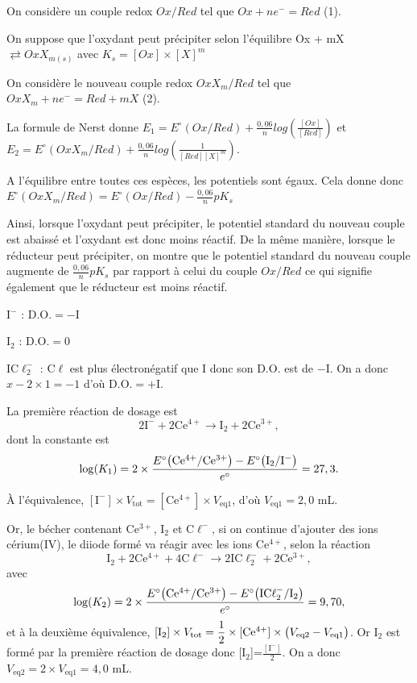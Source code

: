 \begin{solution}

\begin{questions}
\questioncours
 On considère un couple redox $Ox/Red$ tel que $Ox + ne^- = Red$ (1).
 
 On suppose que l'oxydant peut précipiter selon l'équilibre Ox + mX $\rightleftarrows OxX_{m(s)}$ avec $K_s=[Ox]\times[X]^m$
 
 On considère le nouveau couple redox $OxX_m/Red$ tel que $OxX_m + ne^- = Red + mX $   (2).
 
 La formule de Nerst donne $E_1 = E^\circ(Ox/Red) + \frac{0,06}{n}log(\frac{[Ox]}{[Red]})$ et $E_2 = E^\circ(OxX_m/Red) + \frac{0,06}{n}log(\frac{1}{[Red][X]^m})$.
 
A l'équilibre entre toutes ces espèces, les potentiels sont égaux. Cela donne donc $E^\circ(OxX_m/Red) = E^\circ(Ox/Red) - \frac{0,06}{n}pK_s $

Ainsi, lorsque l'oxydant peut précipiter, le potentiel standard du nouveau couple est abaissé et l'oxydant est donc moins réactif. De la même manière, lorsque le réducteur peut précipiter, on montre que le potentiel standard du nouveau couple augmente de $\frac{0,06}{n}pK_s$ par rapport à celui du couple $Ox/Red$ ce qui signifie également que le réducteur est moins réactif. 


\question I$^-$ : D.O.${} = -$I

I$_2$ : D.O.${} = 0$

IC$\ell_2^-$ : C$\ell$ est plus électronégatif que I donc son D.O. est de $-$I. On a donc $x-2\times1 = -1$ d'où D.O.${} = +$I.

\question La première réaction de dosage est
\begin{equation}
    \mathrm{2I^- + 2Ce^{4+} \longrightarrow I_2 + 2Ce^{3+}}, \tag{1}
\end{equation}
dont la constante est
$$\log(K_1) = 2 \times\dfrac{E^\circ\qty\big(\mathrm{Ce^{4+} / Ce^{3+}}) - E^\circ\qty\big(\mathrm{I_2 /I^-})}{e^\circ} = 27,3.$$

\`A l'équivalence, $\mathrm{[I^-]} \times V_\text{tot} = \mathrm{[Ce^{4+}]} \times V_\text{eq1}$, d'où $V_\text{eq1} = 2,0$ mL. 

Or, le bécher contenant Ce$^{3+}$, I$_2$ et C$\ell^-$, si on continue d'ajouter des ions cérium(IV), le diiode formé va réagir avec les ions Ce$^{4+}$, selon la réaction
\begin{equation}
    \mathrm{I_2 + 2Ce^{4+} + 4 C\ell^- \longrightarrow 2 IC\ell_2^- + 2Ce^{3+}}, \tag{2}
\end{equation}
avec
$$\log(K_2) = 2 \times\dfrac{E^\circ\qty\big(\mathrm{Ce^{4+} / Ce^{3+}}) - E^\circ\qty\big(\mathrm{IC\ell_2^- /I_2})}{e^\circ} = 9,70,$$
et à la deuxième équivalence, $\mathrm{[I_2]} \times V_\text{tot} = \dfrac{1}{2} \times \mathrm{[Ce^{4+}]} \times \qty\big(V_\text{eq2} - V_\text{eq1})$. Or I$_2$ est formé par la première réaction de dosage donc [I$_2$]=$\frac{[\text{I}^-]}{2}$. On a donc $V_\text{eq2} = 2 \times V_\text{eq1} = 4,0$ mL.


\end{questions}
\end{solution}
